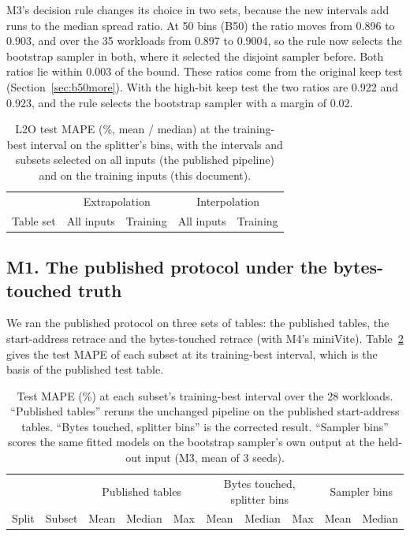 \documentclass[11pt]{article}
\newcommand{\tabinput}[1]{}
\begin{document}
M3's decision rule changes its choice in two sets, because the new intervals add runs to the median spread ratio.
At 50 bins (B50) the ratio moves from 0.896 to 0.903, and over the 35 workloads from 0.897 to 0.9004, so the rule
now selects the bootstrap sampler in both, where it selected the disjoint sampler before. Both ratios lie within
0.003 of the bound. These ratios come from the original keep test (Section~\ref{sec:b50more}). With the high-bit keep
test the two ratios are 0.922 and 0.923, and the rule selects the bootstrap sampler with a margin of 0.02.

\begin{table}[htbp]
\centering
\caption{L2O test MAPE (\%, mean / median) at the training-best interval on the splitter's bins, with the intervals
and subsets selected on all inputs (the published pipeline) and on the training inputs (this document).}
\label{tab:trainsel}
\footnotesize
\begin{tabular}{@{}lrrrr@{}}
\toprule
& \multicolumn{2}{c}{Extrapolation} & \multicolumn{2}{c}{Interpolation} \\
\cmidrule(lr){2-3}\cmidrule(l){4-5}
Table set & All inputs & Training & All inputs & Training \\
\midrule
\tabinput{trainsel}
\bottomrule
\end{tabular}
\end{table}

\subsection{M1. The published protocol under the bytes-touched truth}
\label{sec:m1}

We ran the published protocol on three sets of tables: the published tables, the start-address retrace and the
bytes-touched retrace (with M4's miniVite). Table~\ref{tab:m1} gives the test MAPE of each subset at its
training-best interval, which is the basis of the published test table.

\begin{table}[htbp]
\centering
\caption{Test MAPE (\%) at each subset's training-best interval over the 28 workloads. ``Published tables''
reruns the unchanged pipeline on the published start-address tables. ``Bytes touched, splitter bins'' is the
corrected result. ``Sampler bins'' scores the same fitted models on the bootstrap sampler's own output at the
held-out input (M3, mean of 3 seeds).}
\label{tab:m1}
\small
\begin{tabular}{@{}llrrrrrrrr@{}}
\toprule
& & \multicolumn{3}{c}{Published tables} & \multicolumn{3}{c}{Bytes touched, splitter bins}
& \multicolumn{2}{c}{Sampler bins} \\
\cmidrule(lr){3-5}\cmidrule(lr){6-8}\cmidrule(l){9-10}
Split & Subset & Mean & Median & Max & Mean & Median & Max & Mean & Median \\
\midrule
\tabinput{m1}
\bottomrule
\end{tabular}
\end{table}
\end{document}
